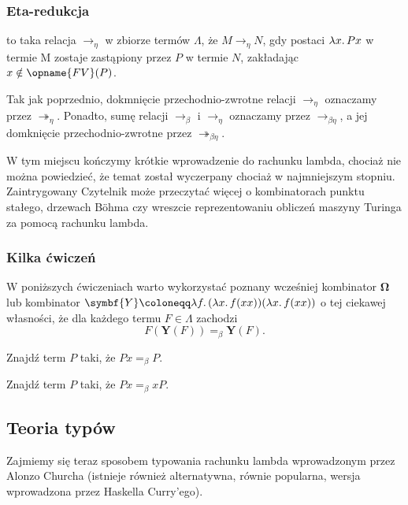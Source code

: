 \documentclass[polish,pretty]{angav}
\newcommand{\toto}{\twoheadrightarrow}
\newcommand{\FV}{\opname{FV}}
\begin{document}
\subsubsection*{Eta-redukcja}

 to taka relacja $\to_\eta$ w zbiorze termów $\Lambda$, że $M \to_\eta N$, gdy  postaci $\lambda x\ldotp Px$ w termie M zostaje zastąpiony przez $P$ w termie $N$, zakładając $x \notin \FV(P)$.

Tak jak poprzednio, dokmnięcie przechodnio-zwrotne relacji $\to_\eta$ oznaczamy przez $\toto_\eta$. Ponadto, sumę relacji $\to_\beta$ i $\to_\eta$ oznaczamy przez $\to_{\beta\eta}$, a jej domknięcie przechodnio-zwrotne przez $\toto_{\beta\eta}$.


W tym miejscu kończymy krótkie wprowadzenie do rachunku lambda, chociaż nie można powiedzieć, że temat został wyczerpany chociaż w najmniejszym stopniu. Zaintrygowany Czytelnik może przeczytać więcej o kombinatorach punktu stałego, drzewach Böhma czy wreszcie reprezentowaniu obliczeń maszyny Turinga za pomocą rachunku lambda.

\subsubsection*{Kilka ćwiczeń}

W poniższych ćwiczeniach warto wykorzystać poznany wcześniej kombinator $\symbf{\Omega}$ lub kombinator $\symbf{Y} \coloneqq \lambda f\ldotp (\lambda x\ldotp f (xx)) (\lambda x\ldotp f (xx))$ o tej ciekawej własności, że dla każdego termu $F \in \Lambda$ zachodzi
\[ F(\symbf{Y}(F)) =_\beta \symbf{Y}(F). \]

\begin{problem}
    Znajdź term $P$ taki, że $Px =_\beta P$.
\end{problem}

\begin{problem}
    Znajdź term $P$ taki, że $Px =_\beta xP$.
\end{problem}

\subsection{Teoria typów}

Zajmiemy się teraz sposobem typowania rachunku lambda wprowadzonym przez Alonzo Churcha (istnieje również alternatywna, równie popularna, wersja wprowadzona przez Haskella Curry'ego).
\end{document}
